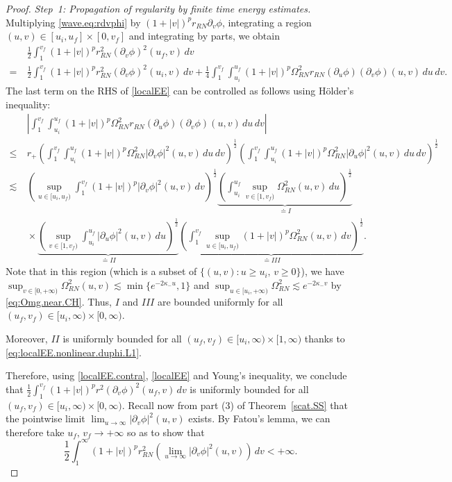 \documentclass[10pt, reqno]{amsart}
\theoremstyle{definition}
\theoremstyle{remark}
\numberwithin{equation}{section}
\def\ls{\lesssim}
\newcommand{\rd}{\partial}
\newcommand{\0}{\emptyset}
\newcommand{\Omg}{\Omega}
\newcommand{\f}{\frac}
\newcommand{\pfstep}[1]{\vspace{.5em} {\it #1.}}
\begin{document}
\begin{proof}
\pfstep{Step~1: Propagation of regularity by finite time energy estimates} Multiplying \eqref{wave.eq:rdvphi} by $(1+|v|)^{p} r_{RN}\rd_v\phi$, integrating a region $(u,v)\in [u_i,u_f]\times [0,v_f]$ and integrating by parts, we obtain
\begin{equation}\label{localEE}
\begin{split}
&\:\f 12 \int_1^{v_f} (1+|v|)^{p} r_{RN}^2(\rd_v\phi)^2(u_f,v)\, dv \\
=&\: \f 12 \int_1^{v_f} (1+|v|)^{p} r_{RN}^2(\rd_v\phi)^2(u_i,v)\, dv + \f 14 \int_1^{v_f}\int_{u_i}^{u_f} (1+|v|)^{p} \Omg_{RN}^2 r_{RN} (\rd_u\phi)(\rd_v\phi)(u,v) \,du\,dv.
\end{split}
\end{equation}
The last term on the RHS of \eqref{localEE} can be controlled as follows using H\"older's inequality:
\begin{equation*}
\begin{split}
&\: \left|\int_1^{v_f}\int_{u_i}^{u_f} (1+|v|)^{p} \Omg_{RN}^2 r_{RN} (\rd_u\phi)(\rd_v\phi)(u,v) \,du\,dv \right|\\
\leq &\: r_+ \left(\int_1^{v_f}\int_{u_i}^{u_f} (1+|v|)^{p} \Omg_{RN}^2|\rd_v\phi|^2(u,v) \,du\,dv\right)^{\f 12}\left(\int_1^{v_f}\int_{u_i}^{u_f} (1+|v|)^{p} \Omg_{RN}^2 |\rd_u\phi|^2(u,v) \,du\,dv\right)^{\f 12}\\
\ls &\: \left(\sup_{u\in [u_i,u_f)}\int_{1}^{v_f} (1+|v|)^{p}|\rd_v\phi|^2(u,v)\, dv\right)^{\f 12} \underbrace{\left(\int_{u_i}^{u_f} \sup_{v\in [1,v_f)}\Omg_{RN}^2(u,v)\, du\right)^{\f 12}}_{\doteq I}\\
&\:\times \underbrace{\left(\sup_{v\in [1,v_f)}\int_{u_i}^{u_f} |\rd_u\phi|^2(u,v)\, du\right)^{\f 12}}_{\doteq II} \underbrace{\left(\int_{1}^{v_f} \sup_{u\in [u_i,u_f)}(1+|v|)^{p}\Omg_{RN}^2(u,v)\, dv\right)^{\f 12}}_{\doteq III}.
\end{split}
\end{equation*}
Note that in this region (which is a subset of $\{(u,v): u\geq u_i,\, v\geq 0\}$), we have $\sup_{v\in [0,+\infty)} \Omg_{RN}^2(u,v) \ls \min\{e^{- 2\kappa_- u}, 1\}$ and $\sup_{u\in [u_i,+\infty)} \Omg_{RN}^2 \ls e^{-2 \kappa_- v}$ by \eqref{eq:Omg.near.CH}. Thus, $I$ and $III$ are bounded uniformly for all $(u_f,v_f)\in [u_i,\infty)\times [0,\infty)$. 

Moreover, $II$ is uniformly bounded for all $(u_f,v_f)\in [u_i,\infty)\times [1,\infty)$ thanks to \eqref{eq:localEE.nonlinear.duphi.L1}.

Therefore, using \eqref{localEE.contra}, \eqref{localEE} and Young's inequality, we conclude that $\f 12 \int_1^{v_f} (1+|v|)^{p} r^2(\rd_v\phi)^2(u_f,v)\, dv$ is uniformly bounded for all $(u_f,v_f)\in [u_i,\infty)\times [0,\infty)$. Recall now from part (3) of Theorem~\ref{scat.SS} that the pointwise limit $\lim_{u\to\infty}|\rd_v\phi|^2(u,v)$ exists. By Fatou's lemma, we can therefore take $u_f,\,v_f\to +\infty$ so as to show that 
\begin{equation}\label{eq:to.contradict.the.global.blowup}
\f 12 \int_1^{\infty} (1+|v|)^{p} r_{RN}^2(\lim_{u\to\infty}|\rd_v\phi|^2(u,v))\, dv < +\infty.
\end{equation}


\end{proof}
\end{document}

